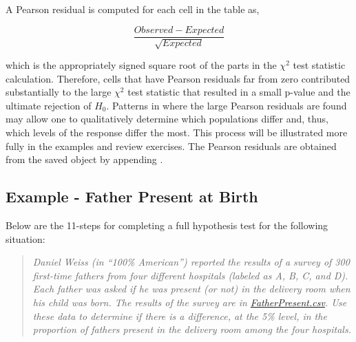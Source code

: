 \documentclass[10pt,openany]{book}\usepackage[]{graphicx}\usepackage[]{color}
\begin{document}
A Pearson residual is computed for each cell in the table as,

\[ \frac{Observed-Expected}{\sqrt{Expected}} \]

which is the appropriately signed square root of the parts in the $\chi^2$ test statistic calculation. Therefore, cells that have Pearson residuals far from zero contributed substantially to the large $\chi^2$ test statistic that resulted in a small p-value and the ultimate rejection of $H_{0}$. Patterns in where the large Pearson residuals are found may allow one to qualitatively determine which populations differ and, thus, which levels of the response differ the most. This process will be illustrated more fully in the examples and review exercises. The Pearson residuals are obtained from the saved  object by appending .

\subsection{Example - Father Present at Birth}
Below are the 11-steps  for completing a full hypothesis test for the following situation:
\vspace{-8pt}
\begin{quote}
\textsl{Daniel Weiss (in ``100\% American'') reported the results of a survey of 300 first-time fathers from four different hospitals (labeled as A, B, C, and D). Each father was asked if he was present (or not) in the delivery room when his child was born. The results of the survey are in \href{https://raw.githubusercontent.com/droglenc/NCData/master/FatherPresent.csv}{FatherPresent.csv}. Use these data to determine if there is a difference, at the 5\% level, in the proportion of fathers present in the delivery room among the four hospitals.}
\end{quote}
\end{document}
